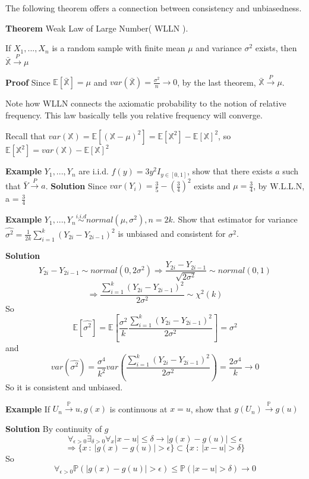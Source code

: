 \documentclass[a4paper,12pt]{article}
\begin{document}
The following theorem offers a connection between consistency and unbiasedness. 

\textbf{Theorem} Weak Law of Large Number( WLLN ).

If $X_1, ..., X_n$ is a random sample with finite mean $\mu$ and variance $\sigma^2$ exists, then $\bar{\mathbb{X}} \overset{P}{\to} \mu$

\textbf{Proof} Since $\mathbb{E}[\bar{\mathbb{X}}] = \mu$ and $var(\bar{\mathbb{X}}) = \frac{\sigma^2}{n} \to 0$, by the last theorem, $\bar{\mathbb{X}} \overset{P}{\to} \mu$. 

Note how WLLN connects the axiomatic probability to the notion of relative frequency. This law basically tells you relative frequency will converge. 

Recall that $var(\mathbb{X}) = \mathbb{E}[(\mathbb{X}-\mu)^2] = \mathbb{E}[\mathbb{X}^2] - \mathbb{E}[\mathbb{X}]^2$, so $ \mathbb{E}[\mathbb{X}^2] = var(\mathbb{X}) - \mathbb{E}[\mathbb{X}]^2$ 

\textbf{Example} $Y_1, ..., Y_n$ are i.i.d. $f(y) = 3y^2 I_{y\in[0,1]}$, show that there exists $a$ such that $\bar{Y} \overset{P} {\to} a$. 
\textbf{Solution} Since $var(Y_i) = \frac{3}{5}-(\frac{3}{4})^2$ exists and $\mu = \frac{3}{4}$, by W.L.L.N, a = $\frac{3}{4}$ 

\textbf{Example} $Y_1, ..., Y_n \overset{i.i.d}{\sim} normal(\mu, \sigma^2), n=2k$. Show that estimator for variance $\hat{\sigma^2} = \frac{1}{2k}\sum_{i=1}^k(Y_{2i} - Y_{2i-1})^2$ is unbiased and consistent for $\sigma^2$. 

\textbf{Solution}
$$Y_{2i} - Y_{2i-1} \sim normal(0, 2\sigma^2) \Rightarrow \frac{Y_{2i} - Y_{2i-1}}{\sqrt{2\sigma^2}} \sim normal(0, 1)$$
$$\Rightarrow\frac{\sum_{i=1}^k(Y_{2i} - Y_{2i-1})^2}{2\sigma^2} \sim \chi^2(k)$$
So
$$\mathbb{E}[ \hat{\sigma^2} ] = \mathbb{E}[\frac{\sigma^2}{k} \frac{\sum_{i=1}^k(Y_{2i} - Y_{2i-1})^2}{2\sigma^2}] = \sigma^2$$
and
$$var(\hat{\sigma^2}) = \frac{\sigma^4}{k^2} var(  \frac{\sum_{i=1}^k(Y_{2i} - Y_{2i-1})^2}{2\sigma^2} ) = \frac{2\sigma^4}{k} \to 0$$
So it is consistent and unbiased. 

\textbf{Example} If $U_n \overset{\mathbb{P}}{\to} u, g(x)$ is continuous at $x=u$, show that $g(U_n) \overset{\mathbb{P}}{\to} g(u)$ 

\textbf{Solution} By continuity of $g$
$$\forall_{\epsilon > 0} \exists_{\delta>0} \forall_{x} |x-u|\leq\delta \to |g(x)-g(u)|\leq \epsilon$$
$$\Rightarrow \{ x\ : \ |g(x)-g(u)| > \epsilon \} \subset \{ x\ : \ |x-u|> \delta \}$$
So
$$\forall_{\epsilon > 0} \mathbb{P}( |g(x)-g(u)| > \epsilon ) \leq \mathbb{P}( |x-u|> \delta ) \to 0$$
\end{document}
